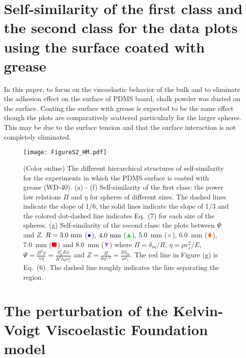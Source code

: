 \documentclass[aps,prl,superscriptaddress]{revtex4}  %
\begin{document}
\section{Self-similarity of the first class and the second class for the data plots using the surface coated with grease}

In this paper, to focus on the viscoelastic behavior of the bulk and to eliminate the adhesion effect on the surface of PDMS board, chalk powder was dusted on the surface. Coating the surface with grease is expected to be the same effect though the plots are comparatively scattered particularly for the larger spheres. This may be due to the surface tension and that the surface interaction is not completely eliminated.
%
\begin{figure*}[t]
\begin{center}
\texttt{[image: FigureS2\_HM.pdf]}
\caption{(Color online) The different hierarchical structures of self-similarity for the experiments in which the PDMS surface is coated with grease (WD-40). (a) - (f) Self-similarity of the first class: the power law relations $\Pi$ and $\eta$ for spheres of different sizes. The dashed lines indicate the slope of 1/6, the solid lines indicate the slope of 1/3 and the colored dot-dashed line indicates Eq.~(7) for each size of the spheres. (g) Self-similarity of the second class: the plots between $\Psi$ and $Z$. $R = {\rm 3.0~mm}$ ($\textcolor{blue}{\bullet}$), ${\rm 4.0~mm}$ ($\textcolor{green}{\blacktriangle}$), {\rm 5.0~mm} ($\times$), {\rm 6.0~mm} ($\textcolor{orange}{\blacklozenge}$), {\rm 7.0~mm} ($\textcolor{red}{\blacksquare}$)  and {\rm 8.0~mm} ($\textcolor[rgb]{0.7, 0.4, 0.9}{\blacktriangledown}$) where $\Pi=\delta_m/R$, $\eta=\rho v_i^2/E$, $\Psi=\frac{\Pi^3 \phi}{\kappa \eta} = \frac{ \delta_m^3 E \phi}{ R^{2} h \rho v_i^2} $ and $Z = \frac{ \Pi}{ \theta \eta^{1/2}} = \frac{ E \delta_m }{ \mu  v_i}$. The red line in Figure (g) is Eq.~(6). The dashed line roughly indicates the line separating the region.}
\label{fig:FSS2}
\end{center}
\end{figure*} 
% 


\section{The perturbation of the Kelvin-Voigt Viscoelastic Foundation model}
\end{document}
